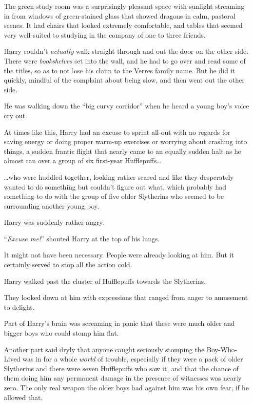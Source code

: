 The green study room was a surprisingly pleasant space with sunlight streaming in from windows of green-stained glass that showed dragons in calm, pastoral scenes. It had chairs that looked extremely comfortable, and tables that seemed very well-suited to studying in the company of one to three friends.

Harry couldn’t \emph{actually} walk straight through and out the door on the other side. There were \emph{bookshelves} set into the wall, and he had to go over and read some of the titles, so as to not lose his claim to the Verres family name. But he did it quickly, mindful of the complaint about being slow, and then went out the other side.

He was walking down the “big curvy corridor” when he heard a young boy’s voice cry out.

At times like this, Harry had an excuse to sprint all-out with no regards for saving energy or doing proper warm-up exercises or worrying about crashing into things, a sudden frantic flight that nearly came to an equally sudden halt as he almost ran over a group of six first-year Hufflepuffs…

…who were huddled together, looking rather scared and like they desperately wanted to do something but couldn’t figure out what, which probably had something to do with the group of five older Slytherins who seemed to be surrounding another young boy.

Harry was suddenly rather angry.

“\emph{Excuse me!}” shouted Harry at the top of his lungs.

It might not have been necessary. People were already looking at him. But it certainly served to stop all the action cold.

Harry walked past the cluster of Hufflepuffs towards the Slytherins.

They looked down at him with expressions that ranged from anger to amusement to delight.

Part of Harry’s brain was screaming in panic that these were much older and bigger boys who could stomp him flat.

Another part said dryly that anyone caught seriously stomping the Boy-Who-Lived was in for a whole \emph{world} of trouble, especially if they were a pack of older Slytherins and there were seven Hufflepuffs who saw it, and that the chance of them doing him any permanent damage in the presence of witnesses was nearly zero. The only real weapon the older boys had against him was his own fear, if he allowed that.

